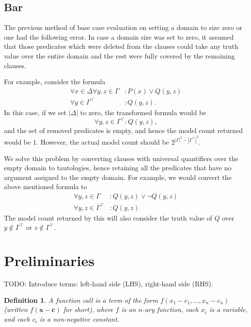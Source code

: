 \documentclass{article}
\newtheorem{definition}{Definition}
\begin{document}
\subsection{Bar}

The previous method of base case evaluation on setting a domain to size zero or
one had the following error. In case a domain size was set to zero, it assumed
that those predicates which were deleted from the clauses could take any truth
value over the entire domain and the rest were fully covered by the remaining
clauses.

For example, consider the formula
\begin{equation}\label{eq:example}
  \begin{split}
    \forall x \in \Delta \forall y, z \in \Gamma &: P(x) \lor Q(y, z) \\
    \forall y \in \Gamma^\top &: Q(y, z).
  \end{split}
\end{equation}
In this case, if we set $|\Delta|$ to zero, the transformed formula would be
\[
  \forall y, z \in \Gamma^\top : Q(y, z),
\]
and the set of removed predicates is empty, and hence the model count returned
would be $1$. However, the actual model count should be
$2^{|\Gamma|^2 - |\Gamma^\top|^2}$.

We solve this problem by converting clauses with universal quantifiers over the
empty domain to tautologies, hence retaining all the predicates that have no
argument assigned to the empty domain. For example, we would convert the above
mentioned formula to
\begin{align*}
  \forall y, z \in \Gamma &: Q(y, z) \lor \neg Q(y, z) \\
  \forall y, z \in \Gamma^\top &: Q(y, z)
\end{align*}
The model count returned by this will also consider the truth value of $Q$ over
$y \not \in \Gamma^\top$ or $z \not \in \Gamma^\top$.

\section{Preliminaries}

TODO: Introduce terms: left-hand side (LHS), right-hand side (RHS).

\begin{definition}
  A \emph{function call} is a term of the form
  $f(x_{1} - c_{1}, \dots, x_{n} - c_{n})$ (written $f(\mathbf{x} - \mathbf{c})$
  for short), where $f$ is an $n$-ary function, each $x_{i}$ is a variable, and
  each $c_{i}$ is a non-negative constant.
\end{definition}
\end{document}
